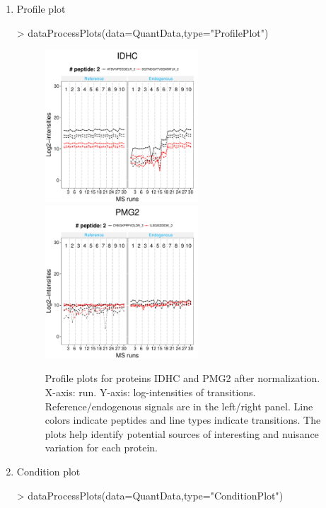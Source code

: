 \documentclass[11pt]{article}
\begin{document}
\begin{enumerate}
\begin{enumerate}
\clearpage

\vspace{-0.5cm}
\item{Profile plot}
\begin{small}
\begin{Schunk}
\begin{Sinput}
> dataProcessPlots(data=QuantData,type="ProfilePlot")
\end{Sinput}
\end{Schunk}
\end{small}


\begin{figure}[ht!]
\centering
\includegraphics[width=2.25in]{ProfilePlot1.pdf}
\includegraphics[width=2.25in]{ProfilePlot2.pdf}
\vspace{-0.3cm}
\caption{\small Profile plots for proteins IDHC and PMG2 after normalization. X-axis: run. Y-axis: log-intensities of transitions. Reference/endogenous signals are in the left/right panel. Line colors indicate peptides and line types indicate transitions. The plots help identify potential sources of interesting and nuisance variation for each protein.}
\label{fig:Profile}
\end{figure}


\item{Condition plot}

\begin{small}
\begin{Schunk}
\begin{Sinput}
> dataProcessPlots(data=QuantData,type="ConditionPlot")
\end{Sinput}
\end{Schunk}
\end{small}


\end{enumerate}
\end{enumerate}
\end{document}
